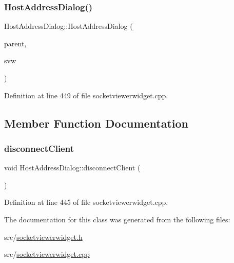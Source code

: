 \subsubsection{\texorpdfstring{HostAddressDialog()}{HostAddressDialog()}}
{\footnotesize\ttfamily Host\+Address\+Dialog\+::\+Host\+Address\+Dialog (\begin{DoxyParamCaption}\item[{Q\+Widget $\ast$}]{parent,  }\item[{\mbox{\hyperlink{class_socket_viewer_widget}{Socket\+Viewer\+Widget}} $\ast$}]{svw }\end{DoxyParamCaption})}



Definition at line 449 of file socketviewerwidget.\+cpp.



\subsection{Member Function Documentation}
\mbox{\label{class_host_address_dialog_a1a2b97b755df7b673a593aca4fb42791}} 
\subsubsection{\texorpdfstring{disconnectClient}{disconnectClient}}
{\footnotesize\ttfamily void Host\+Address\+Dialog\+::disconnect\+Client (\begin{DoxyParamCaption}{ }\end{DoxyParamCaption})\hspace{0.3cm}{\ttfamily [slot]}}



Definition at line 445 of file socketviewerwidget.\+cpp.



The documentation for this class was generated from the following files\+:\begin{DoxyCompactItemize}
\item 
src/\mbox{\hyperlink{socketviewerwidget_8h}{socketviewerwidget.\+h}}\item 
src/\mbox{\hyperlink{socketviewerwidget_8cpp}{socketviewerwidget.\+cpp}}\end{DoxyCompactItemize}
